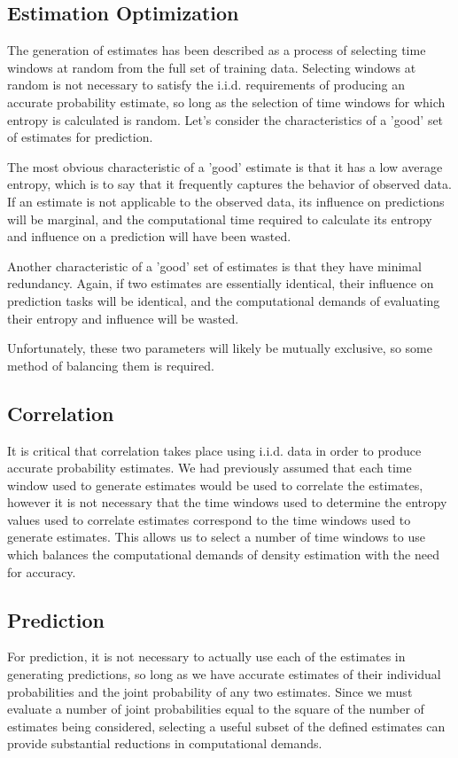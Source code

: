 \documentclass[11pt,twocolumn,titlepage]{article}
\begin{document}
\subsection{Estimation Optimization}
The generation of estimates has been described as a process of selecting time windows at random from the full set of training data.  Selecting windows at random is not necessary to satisfy the i.i.d. requirements of producing an accurate probability estimate, so long as the selection of time windows for which entropy is calculated is random.  Let's consider the characteristics of a 'good' set of estimates for prediction.  

The most obvious characteristic of a 'good' estimate is that it has a low average entropy, which is to say that it frequently captures the behavior of observed data.  If an estimate is not applicable to the observed data, its influence on predictions will be marginal, and the computational time required to calculate its entropy and influence on a prediction will have been wasted.  

Another characteristic of a 'good' set of estimates is that they have minimal redundancy.  Again, if two estimates are essentially identical, their influence on prediction tasks will be identical, and the computational demands of evaluating their entropy and influence will be wasted. 

Unfortunately, these two parameters will likely be mutually exclusive, so some method of balancing them is required.

\subsection{Correlation}
It is critical that correlation takes place using i.i.d. data in order to produce accurate probability estimates.  We had previously assumed that each time window used to generate estimates would be used to correlate the estimates, however it is not necessary that the time windows used to determine the entropy values used to correlate estimates correspond to the time windows used to generate estimates.  This allows us to select a number of time windows to use which balances the computational demands of density estimation with the need for accuracy.

\subsection{Prediction}
For prediction, it is not necessary to actually use each of the estimates in generating predictions, so long as we have accurate estimates of their individual probabilities and the joint probability of any two estimates.  Since we must evaluate a number of joint probabilities equal to the square of the number of estimates being considered, selecting a useful subset of the defined estimates can provide substantial reductions in computational demands.
\end{document}
